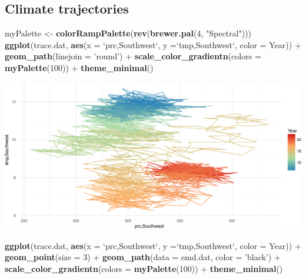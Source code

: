 \documentclass[11pt,]{tufte-handout}
\newenvironment{Shaded}{}{}
\newcommand{\KeywordTok}[1]{\textcolor[rgb]{0.00,0.44,0.13}{\textbf{{#1}}}}
\newcommand{\DataTypeTok}[1]{\textcolor[rgb]{0.56,0.13,0.00}{{#1}}}
\newcommand{\DecValTok}[1]{\textcolor[rgb]{0.25,0.63,0.44}{{#1}}}
\newcommand{\StringTok}[1]{\textcolor[rgb]{0.25,0.44,0.63}{{#1}}}
\newcommand{\NormalTok}[1]{{#1}}
\begin{document}
\subsection{Climate trajectories}\label{climate-trajectories}

\begin{Shaded}
\begin{Highlighting}[]
\NormalTok{myPalette <-}\StringTok{ }\KeywordTok{colorRampPalette}\NormalTok{(}\KeywordTok{rev}\NormalTok{(}\KeywordTok{brewer.pal}\NormalTok{(}\DecValTok{4}\NormalTok{, }\StringTok{"Spectral"}\NormalTok{)))}
\KeywordTok{ggplot}\NormalTok{(trace.dat, }\KeywordTok{aes}\NormalTok{(}\DataTypeTok{x =} \StringTok{`}\DataTypeTok{prc,Southwest}\StringTok{`}\NormalTok{, }\DataTypeTok{y =}\StringTok{`}\DataTypeTok{tmp,Southwest}\StringTok{`}\NormalTok{, }\DataTypeTok{color =} \NormalTok{Year)) +}
\StringTok{  }\KeywordTok{geom_path}\NormalTok{(}\DataTypeTok{linejoin =} \StringTok{'round'}\NormalTok{) +}\StringTok{ }
\StringTok{  }\KeywordTok{scale_color_gradientn}\NormalTok{(}\DataTypeTok{colors =} \KeywordTok{myPalette}\NormalTok{(}\DecValTok{100}\NormalTok{)) +}
\StringTok{  }\KeywordTok{theme_minimal}\NormalTok{()}
\end{Highlighting}
\end{Shaded}

\includegraphics{climate-analysis_files/figure-latex/unnamed-chunk-6-1}

\begin{Shaded}
\begin{Highlighting}[]
\KeywordTok{ggplot}\NormalTok{(trace.dat, }\KeywordTok{aes}\NormalTok{(}\DataTypeTok{x =} \StringTok{`}\DataTypeTok{prc,Southwest}\StringTok{`}\NormalTok{, }\DataTypeTok{y =}\StringTok{`}\DataTypeTok{tmp,Southwest}\StringTok{`}\NormalTok{, }\DataTypeTok{color =} \NormalTok{Year)) +}
\StringTok{  }\KeywordTok{geom_point}\NormalTok{(}\DataTypeTok{size =} \DecValTok{3}\NormalTok{) +}\StringTok{ }
\StringTok{  }\KeywordTok{geom_path}\NormalTok{(}\DataTypeTok{data =} \NormalTok{emd.dat, }\DataTypeTok{color =} \StringTok{'black'}\NormalTok{) +}\StringTok{ }
\StringTok{  }\KeywordTok{scale_color_gradientn}\NormalTok{(}\DataTypeTok{colors =} \KeywordTok{myPalette}\NormalTok{(}\DecValTok{100}\NormalTok{)) +}
\StringTok{  }\KeywordTok{theme_minimal}\NormalTok{()}
\end{Highlighting}
\end{Shaded}
\end{document}
